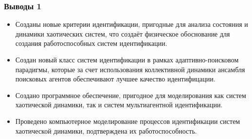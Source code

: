 \documentclass[10pt,utf8]{beamer}
\begin{document}

\begin{frame}
  \frametitle{Выводы 1}

  \begin{itemize}

    \item
      Созданы новые критерии идентификации,
      пригодные для анализа состояния и динамики хаотических систем, что создаёт
      физическое  обоснование для создания работоспособных систем идентификации.

    \item
      Создан новый класс систем идентификации в рамках адаптивно-поисковом парадигмы,
      которые за счет использования коллективной динамики ансамбля поисковых
      агентов обеспечивают лучшее качество идентифицации.

    \item
      Создано программное обеспечение, пригодное для моделирования как систем
      хаотической динамики, так и систем мультиагентной идентификации.

    \item
      Проведено компьютерное моделирование процессов идентификации систем хаотической
      динамики, подтверждена их работоспособность.

  \end{itemize}


\end{frame}



%
%
%
\end{document}
